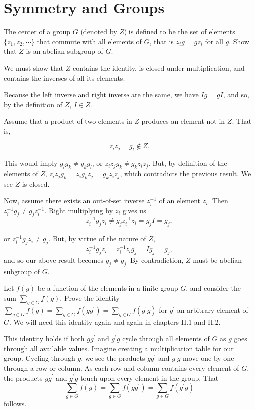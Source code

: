 \documentclass[../group-theory-in-a-nutshell-for-physicists.tex]{subfiles}
\begin{document}
\printanswers

\section{Symmetry and Groups}

\begin{questions}

\question The center of a group $G$ (denoted by $Z$) is defined to be the set
of elements $\{ z_{1},z_{2},\cdots\}$ that commute with all elements
of $G$, that is $z_{i}g = gz_{i}$ for all $g$. Show that $Z$ is
an abelian subgroup of $G$.

\begin{solution}
We must show that $Z$ contains the identity, is closed under
multiplication, and contains the inverses of all its elements.

Because the left inverse and right inverse are the same, we have
$Ig = gI$, and so, by the definition of $Z$, $I \in Z$.

Assume that a product of two elements in $Z$ produces an element not
in $Z$. That is,

\[
	z_{i}z_{j} = g_{l} \notin Z.
\]

This would imply $g_{l}g_{k} \neq g_{k}g_{l}$, or
$z_{i}z_{j}g_k \neq g_kz_{i}z_{j}$. But, by definition of the elements of
$Z$, $z_{i}z_{j}g_{k} = z_{i}g_kz_{j} = g_kz_{i}z_{j}$, which
contradicts the previous result. We see $Z$ is closed.

Now, assume there exists an out-of-set inverse $z_{i}^{- 1}$ of an
element $z_{i}$. Then $z_{i}^{- 1}g_{j} \neq g_{j}z_{i}^{- 1}$.
Right multiplying by $z_{i}$ gives us
\[
z_{i}^{- 1}g_{j}z_{i} \neq g_{j}z_{i}^{- 1}z_{i} = g_{j}I = g_{j},
\]

or $z_{i}^{- 1}g_{j}z_{i} \neq g_{j}$. But, by virtue of the nature of
$Z$,
\[
z_{i}^{- 1}g_{j}z_{i} = z_{i}^{- 1}z_{i}g_{j} = Ig_{j} = g_{j},
\]
and so our above result becomes $g_{j} \neq g_{j}$. By contradiction, $Z$ must be
abelian subgroup of $G$.
\end{solution}

\question Let $f(g)$ be a function of the elements in a finite group $G$, and
consider the sum $\sum_{g \in G}f(g)$. Prove the identity
$\sum_{g \in G}f(g) = \sum_{g \in G}f(gg^{\prime}) = \sum_{g \in G}f(g^{\prime}g)$
for $g^{\prime}$ an arbitrary element of $G$. We will need this
identity again and again in chapters II.1 and II.2.

\begin{solution}
This identity holds if both $gg^{\prime}$ and $g^{\prime}g$ cycle
through all elements of $G$ as $g$ goes through all available
values. Imagine creating a multiplication table for our group. Cycling
through $g$, we see the products $gg^{\prime}$ and $g^{\prime}g$
move one-by-one through a row or column. As each row and column contains
every element of $G$, the products $gg^{\prime}$ and $g^{\prime}g$
touch upon every element in the group. That
\[
\sum_{g \in G}f(g) = \sum_{g \in G}f(gg^{\prime}) = \sum_{g \in G}f(g^{\prime}g)
\]
follows.
\end{solution}


\end{questions}
\end{document}
